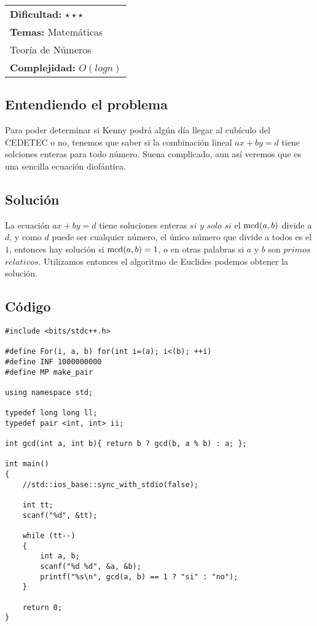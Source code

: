 \hfill
\begin{tabular}{@{}l@{}}
\textbf{Dificultad:} $\star\star\star$ \\
\textbf{Temas:} Matemáticas \\
Teoría de Números \\
\textbf{Complejidad:} $O(log n)$
\end{tabular}

\subsection*{Entendiendo el problema}
Para poder determinar si Kenny podrá algún día llegar al cubículo del CEDETEC o no, tenemos que saber si la combinación lineal $ax+by=d$ tiene solciones enteras para todo número. Suena complicado, aun así veremos que es una sencilla ecuación diofántica.
\subsection*{Solución}
La ecuación $ax+by=d$ tiene soluciones enteras $si$ $y$ $solo$ $si$ el $\textnormal{mcd}(a, b)$ divide a $d$, y como $d$ puede ser cualquier número, el único número que divide a todos es el $1$, entonces hay solución si $\textnormal{mcd}(a,b)=1$, o en otras palabras si $a$ y $b$ son $primos$ $relativos$. Utilizamos entonces el algoritmo de Euclides podemos obtener la solución.

\subsection*{Código}
\begin{verbatim}
#include <bits/stdc++.h>
 
#define For(i, a, b) for(int i=(a); i<(b); ++i)
#define INF 1000000000
#define MP make_pair
 
using namespace std;
 
typedef long long ll;
typedef pair <int, int> ii;
 
int gcd(int a, int b){ return b ? gcd(b, a % b) : a; };
 
int main()
{
    //std::ios_base::sync_with_stdio(false);
 
    int tt;
    scanf("%d", &tt);
 
    while (tt--)
    {
        int a, b;
        scanf("%d %d", &a, &b);
        printf("%s\n", gcd(a, b) == 1 ? "si" : "no");
    }
 
    return 0;
}
\end{verbatim}
